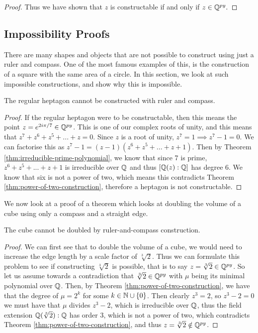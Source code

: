 \begin{proof}
Thus we have shown that $z$ is constructable if and only if $z\in \mathbb Q^{py}.$
\end{proof}



\subsection{Impossibility Proofs}

There are many shapes and objects that are not possible to construct using just a ruler and compass. One of the most famous examples of this, is the construction of a square with the same area of a circle. In this section, we look at such impossible constructions, and show why this is impossible.

\begin{theorem}
    The regular heptagon cannot be constructed with ruler and compass.
\end{theorem}

\begin{proof}
    If the regular heptagon were to be constructable, then this means the point $z=e^{2i\pi/7} \in \mathbb Q^{py}$. This is one of our complex roots of unity, and this means that $z^7+z^6+z^5+...+z=0$. Since $z$ is a root of unity, $z^7=1 \implies z^7 - 1 = 0$. We can factorise this as $z^7-1=(z-1)(z^6+z^5+...+z+1)$. Then by Theorem \ref{thm:irreducible-prime-polynomial}, we know that since 7 is prime, $z^6+z^5+...+z+1$ is irreducible over $\mathbb Q$ and thus $[\mathbb Q(z):\mathbb Q]$ has degree 6. We know that six is not a power of two, which means this contradicts Theorem \ref{thm:power-of-two-construction}, therefore a heptagon is not constructable.
\end{proof}

We now look at a proof of a theorem which looks at doubling the volume of a cube using only a compass and a straight edge.

\begin{theorem}
    The cube cannot be doubled by ruler-and-compass construction.
\end{theorem}

\begin{proof}  
    We can first see that to double the volume of a cube, we would need to increase the edge length by a scale factor of $\sqrt[3]{2}$. Thus we can formulate this problem to see if constructing $\sqrt[3]{2}$ is possible, that is to say $z = \sqrt[3]{2} \in \mathbb Q^{py}$.
\noindent
\newline
    So let us assume towards a contradiction that $\sqrt[3]{2} \in \mathbb Q^{py}$ with $\mu$ being its minimal polynomial over $\mathbb Q$. Then, by Theorem \ref{thm:power-of-two-construction}, we have that the degree of $\mu = 2^k$ for some $k\in \mathbb N \cup \{0\}$.
\noindent
\newline
    Then clearly $z^3=2$, so $z^3-2=0$ we must have that $\mu$ divides $z^3-2$, which is irreducible over $\mathbb Q$, thus the field extension $\mathbb Q(\sqrt[3]{2}):\mathbb Q$ has order $3$, which is not a power of two, which contradicts Theorem \ref{thm:power-of-two-construction}, and thus $z = \sqrt[3]{2} \notin \mathbb Q^{py}$.
\end{proof}


